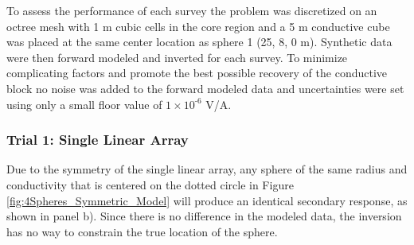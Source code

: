 \documentclass[preprint,authoryear,12pt]{elsarticle}
\begin{document}
To assess the performance of each survey the problem was discretized on an octree mesh with 1 m cubic cells in the core region and a 5 m conductive cube was placed at the same center location as sphere 1 (25, 8, 0 m). Synthetic data were then forward modeled and inverted for each survey. To minimize complicating factors and promote the best possible recovery of the conductive block no noise was added to the forward modeled data and uncertainties were set using only a small floor value of $1 \times 10^{\text{-6}}$ V/A.


\subsubsection{Trial 1: Single Linear Array}
\label{sec:TheoreticalAnalysis_Trial1_SingleLinearArray}

Due to the symmetry of the single linear array, any sphere of the same radius and conductivity that is centered on the dotted circle in Figure \ref{fig:4Spheres_Symmetric_Model} will produce an identical secondary response, as shown in panel b). Since there is no difference in the modeled data, the inversion has no way to constrain the true location of the sphere.
\end{document}
